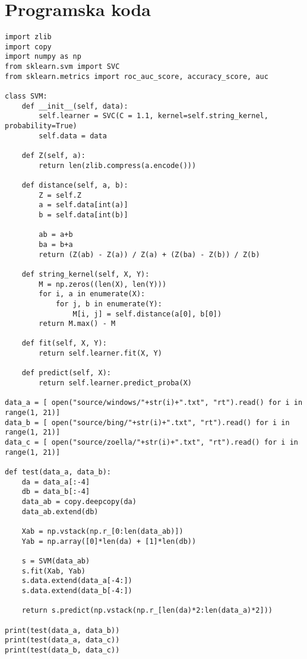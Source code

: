 \documentclass[a4paper,11pt]{article}
\begin{document}
\appendix
\appendixpage

\section{\label{app-code}Programska koda}

\begin{lstlisting}
import zlib
import copy
import numpy as np
from sklearn.svm import SVC
from sklearn.metrics import roc_auc_score, accuracy_score, auc

class SVM:
    def __init__(self, data):
        self.learner = SVC(C = 1.1, kernel=self.string_kernel, probability=True)
        self.data = data

    def Z(self, a):
        return len(zlib.compress(a.encode()))

    def distance(self, a, b):
        Z = self.Z
        a = self.data[int(a)]
        b = self.data[int(b)]

        ab = a+b
        ba = b+a
        return (Z(ab) - Z(a)) / Z(a) + (Z(ba) - Z(b)) / Z(b)

    def string_kernel(self, X, Y):
        M = np.zeros((len(X), len(Y)))
        for i, a in enumerate(X):
            for j, b in enumerate(Y):
                M[i, j] = self.distance(a[0], b[0])
        return M.max() - M

    def fit(self, X, Y):
        return self.learner.fit(X, Y)

    def predict(self, X):
        return self.learner.predict_proba(X)

data_a = [ open("source/windows/"+str(i)+".txt", "rt").read() for i in range(1, 21)]
data_b = [ open("source/bing/"+str(i)+".txt", "rt").read() for i in range(1, 21)]
data_c = [ open("source/zoella/"+str(i)+".txt", "rt").read() for i in range(1, 21)]

def test(data_a, data_b):
    da = data_a[:-4]
    db = data_b[:-4]
    data_ab = copy.deepcopy(da)
    data_ab.extend(db)

    Xab = np.vstack(np.r_[0:len(data_ab)])
    Yab = np.array([0]*len(da) + [1]*len(db))

    s = SVM(data_ab)
    s.fit(Xab, Yab)
    s.data.extend(data_a[-4:])
    s.data.extend(data_b[-4:])

    return s.predict(np.vstack(np.r_[len(da)*2:len(data_a)*2]))

print(test(data_a, data_b))
print(test(data_a, data_c))
print(test(data_b, data_c))
\end{lstlisting}
\end{document}
